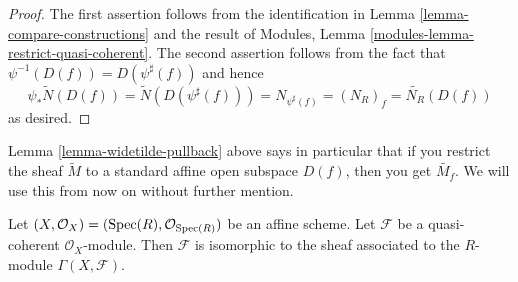 \begin{proof}
The first assertion follows from the identification in
Lemma \ref{lemma-compare-constructions}
and the result of Modules, Lemma \ref{modules-lemma-restrict-quasi-coherent}.
The second assertion follows from the fact
that $\psi^{-1}(D(f)) = D(\psi^\sharp(f))$ and hence
$$
\psi_* \widetilde N(D(f)) = \widetilde N(D(\psi^\sharp(f))) =
N_{\psi^\sharp(f)} = (N_R)_f = \widetilde{N_R}(D(f))
$$
as desired.
\end{proof}

\noindent
Lemma \ref{lemma-widetilde-pullback} above says in particular
that if you restrict
the sheaf $\widetilde M$ to a standard affine open subspace
$D(f)$, then you get $\widetilde{M_f}$. We will use this from
now on without further mention.

\begin{lemma}
\label{lemma-quasi-coherent-affine}
Let $(X, \mathcal{O}_X) = (\mathop{\rm Spec}(R), \mathcal{O}_{\mathop{\rm Spec}(R)})$
be an affine scheme. Let $\mathcal{F}$ be a
quasi-coherent $\mathcal{O}_X$-module. Then
$\mathcal{F}$ is isomorphic to the sheaf associated to
the $R$-module $\Gamma(X, \mathcal{F})$.
\end{lemma}

